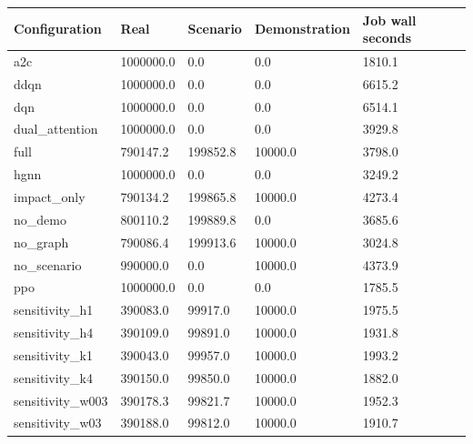 \begin{tabular}{lllll}
\toprule
Configuration & Real & Scenario & Demonstration & Job wall seconds\\
\midrule
a2c & 1000000.0 & 0.0 & 0.0 & 1810.1\\
ddqn & 1000000.0 & 0.0 & 0.0 & 6615.2\\
dqn & 1000000.0 & 0.0 & 0.0 & 6514.1\\
dual\_attention & 1000000.0 & 0.0 & 0.0 & 3929.8\\
full & 790147.2 & 199852.8 & 10000.0 & 3798.0\\
hgnn & 1000000.0 & 0.0 & 0.0 & 3249.2\\
impact\_only & 790134.2 & 199865.8 & 10000.0 & 4273.4\\
no\_demo & 800110.2 & 199889.8 & 0.0 & 3685.6\\
no\_graph & 790086.4 & 199913.6 & 10000.0 & 3024.8\\
no\_scenario & 990000.0 & 0.0 & 10000.0 & 4373.9\\
ppo & 1000000.0 & 0.0 & 0.0 & 1785.5\\
sensitivity\_h1 & 390083.0 & 99917.0 & 10000.0 & 1975.5\\
sensitivity\_h4 & 390109.0 & 99891.0 & 10000.0 & 1931.8\\
sensitivity\_k1 & 390043.0 & 99957.0 & 10000.0 & 1993.2\\
sensitivity\_k4 & 390150.0 & 99850.0 & 10000.0 & 1882.0\\
sensitivity\_w003 & 390178.3 & 99821.7 & 10000.0 & 1952.3\\
sensitivity\_w03 & 390188.0 & 99812.0 & 10000.0 & 1910.7\\
\bottomrule
\end{tabular}